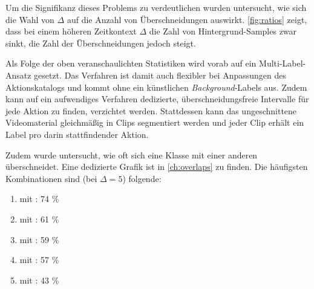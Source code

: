 Um die Signifikanz dieses Problems zu verdeutlichen wurden untersucht, wie sich die Wahl von $\Delta$ auf die Anzahl von Überschneidungen auswirkt.
\autoref{fig:ratios} zeigt, dass bei einem höheren Zeitkontext $\Delta$ die Zahl von Hintergrund-Samples zwar sinkt, die Zahl der Überschneidungen jedoch steigt.

Als Folge der oben veranschaulichten Statistiken wird vorab auf ein Multi-Label-Ansatz gesetzt.
Das Verfahren ist damit auch flexibler bei Anpassungen des Aktionskatalogs und kommt ohne ein künstlichen \emph{Background}-Labels aus.
Zudem kann auf ein aufwendiges Verfahren dedizierte, überschneidungsfreie Intervalle für jede Aktion zu finden, verzichtet werden.
Stattdessen kann das ungeschnittene Videomaterial gleichmäßig in Clips segmentiert werden und jeder Clip erhält ein Label pro darin stattfindender Aktion.

Zudem wurde untersucht, wie oft sich eine Klasse mit einer anderen überschneidet.
Eine dedizierte Grafik ist in \autoref{ch:overlaps} zu finden.
Die häufigsten Kombinationen sind (bei $\Delta=5$) folgende:

\begin{enumerate}
    \item {} mit : 74 \%
    \item {} mit : 61 \%
    \item {} mit : 59 \%
    \item {} mit : 57 \%
    \item {} mit : 43 \%
\end{enumerate}


